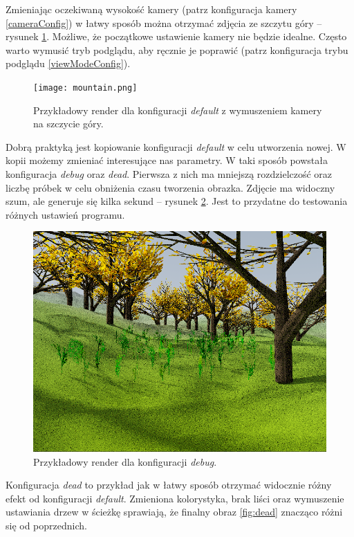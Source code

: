 \documentclass[inz,shortabstract]{iithesis}
\begin{document}
        Zmieniając oczekiwaną wysokość kamery (patrz konfiguracja kamery \ref{cameraConfig}) w łatwy sposób można otrzymać zdjęcia ze szczytu góry -- rysunek \ref{fig:mountain}. Możliwe, że początkowe ustawienie kamery nie będzie idealne. Często warto wymusić tryb podglądu, aby ręcznie je poprawić (patrz konfiguracja trybu podglądu \ref{viewModeConfig}). 
        \begin{figure}[!htbp]
            \texttt{[image: mountain.png]}
            \caption{Przykładowy render dla konfiguracji \textit{default} z wymuszeniem kamery na szczycie góry.} 
            \label{fig:mountain}
        \end{figure}

        Dobrą praktyką jest kopiowanie konfiguracji \textit{default} w celu utworzenia nowej. W kopii możemy zmieniać interesujące nas parametry. W taki sposób powstała konfiguracja \textit{debug} oraz \textit{dead}. Pierwsza z nich ma mniejszą rozdzielczość oraz liczbę próbek w celu obniżenia czasu tworzenia obrazka. Zdjęcie ma widoczny szum, ale generuje się kilka sekund -- rysunek \ref{fig:debug}. Jest to przydatne do testowania różnych ustawień programu.

        \begin{figure}[!htbp] 
            \includegraphics[width=\linewidth]{debug.png}
            \caption{Przykładowy render dla konfiguracji \textit{debug}.} 
            \label{fig:debug}
        \end{figure}
        
        Konfiguracja \textit{dead} to przykład jak w łatwy sposób otrzymać widocznie różny efekt od konfiguracji \textit{default}. Zmieniona kolorystyka, brak liści oraz wymuszenie ustawiania drzew w ścieżkę sprawiają, że finalny obraz \ref{fig:dead} znacząco różni się od poprzednich.
\end{document}
